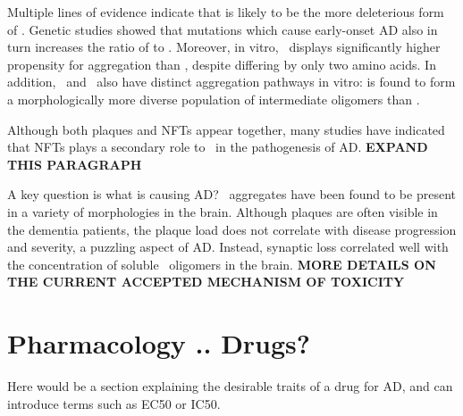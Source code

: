 Multiple lines of evidence indicate that \abetafortytwo is likely to be the more deleterious form of \abeta. Genetic studies showed that mutations which cause early-onset AD also in turn increases the ratio of \abetafortytwo to \abetaforty.\cite{Hardy:1997tu} Moreover, in vitro, \abetafortytwo\ displays significantly higher propensity for aggregation than \abetaforty, despite differing by only two amino acids. In addition, \abetaforty\ and \abetafortytwo\ also have distinct aggregation pathways in vitro: \abetafortytwo is found to form a morphologically more diverse population of intermediate oligomers than \abetaforty.\cite{Bitan:2003ut} %

Although both plaques and NFTs appear together, many studies have indicated that NFTs plays a secondary role to \abeta\ in the pathogenesis of AD.\cite{XXX} \textbf{EXPAND THIS PARAGRAPH} %


A key question is what is causing AD? \abeta\ aggregates have been found to be present in a variety of morphologies in the brain. Although plaques are often visible in the dementia patients, the plaque load does not correlate with disease progression and severity, a puzzling aspect of AD.  Instead, synaptic loss correlated well with the concentration of soluble \abeta\ oligomers in the brain. \textbf{MORE DETAILS ON THE CURRENT ACCEPTED MECHANISM OF TOXICITY}

\section{Pharmacology .. Drugs?}
Here would be a section explaining the desirable traits of a drug for AD, and can introduce terms such as EC50 or IC50.

